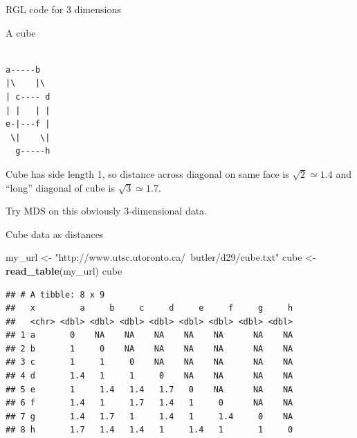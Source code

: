 \documentclass[ignorenonframetext,]{beamer}
\newenvironment{Shaded}{\begin{snugshade}}{\end{snugshade}}
\newcommand{\DataTypeTok}[1]{\textcolor[rgb]{0.13,0.29,0.53}{#1}}
\newcommand{\FloatTok}[1]{\textcolor[rgb]{0.00,0.00,0.81}{#1}}
\newcommand{\KeywordTok}[1]{\textcolor[rgb]{0.13,0.29,0.53}{\textbf{#1}}}
\newcommand{\NormalTok}[1]{#1}
\newcommand{\OperatorTok}[1]{\textcolor[rgb]{0.81,0.36,0.00}{\textbf{#1}}}
\newcommand{\StringTok}[1]{\textcolor[rgb]{0.31,0.60,0.02}{#1}}
\begin{document}
\begin{frame}[fragile]{RGL code for 3 dimensions}
\protect\hypertarget{rgl-code-for-3-dimensions}{}

\begin{Shaded}
\end{Shaded}

\end{frame}

\begin{frame}[fragile]{A cube}
\protect\hypertarget{a-cube}{}

\begin{verbatim}

a-----b
|\    |\
| c---- d
| |   | |
e-|---f |
 \|    \|
  g-----h
\end{verbatim}

Cube has side length 1, so distance across diagonal on same face is
\(\sqrt{2}\simeq 1.4\) and ``long'' diagonal of cube is
\(\sqrt{3}\simeq 1.7\). \vspace{3ex}

Try MDS on this obviously 3-dimensional data.

\end{frame}

\begin{frame}[fragile]{Cube data as distances}
\protect\hypertarget{cube-data-as-distances}{}

\footnotesize

\begin{Shaded}
\begin{Highlighting}[]
\NormalTok{my_url <-}\StringTok{ "http://www.utsc.utoronto.ca/~butler/d29/cube.txt"}
\NormalTok{cube <-}\StringTok{ }\KeywordTok{read_table}\NormalTok{(my_url)}
\NormalTok{cube}
\end{Highlighting}
\end{Shaded}

\begin{verbatim}
## # A tibble: 8 x 9
##   x         a     b     c     d     e     f     g     h
##   <chr> <dbl> <dbl> <dbl> <dbl> <dbl> <dbl> <dbl> <dbl>
## 1 a       0    NA    NA    NA    NA    NA      NA    NA
## 2 b       1     0    NA    NA    NA    NA      NA    NA
## 3 c       1     1     0    NA    NA    NA      NA    NA
## 4 d       1.4   1     1     0    NA    NA      NA    NA
## 5 e       1     1.4   1.4   1.7   0    NA      NA    NA
## 6 f       1.4   1     1.7   1.4   1     0      NA    NA
## 7 g       1.4   1.7   1     1.4   1     1.4     0    NA
## 8 h       1.7   1.4   1.4   1     1.4   1       1     0
\end{verbatim}

\normalsize

\end{frame}
\end{document}
